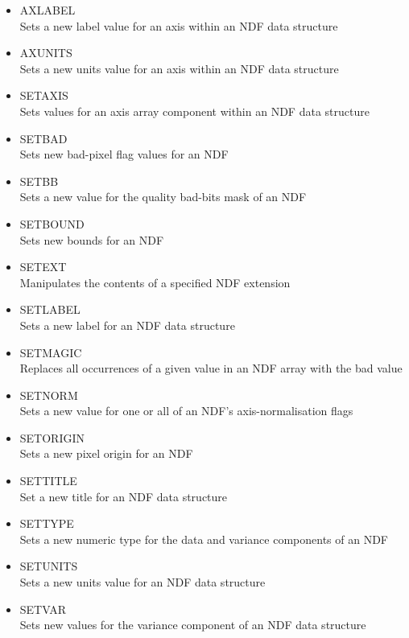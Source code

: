 \documentclass[twoside,11pt]{article}
\newcommand{\xref}[3]{#1}
\begin{document}
\begin{itemize}
\item{\xref{AXLABEL}{sun95}{AXLABEL}}\\
Sets a new label value for an axis within an NDF data structure 
\item{\xref{AXUNITS}{sun95}{AXUNITS}}\\
Sets a new units value for an axis within an NDF data structure 
\item{\xref{SETAXIS}{sun95}{SETAXIS}}\\
Sets values for an axis array component within an NDF data structure 
\item{\xref{SETBAD}{sun95}{SETBAD}}\\
Sets new bad-pixel flag values for an NDF 
\item{\xref{SETBB}{sun95}{SETBB}}\\
Sets a new value for the quality bad-bits mask of an NDF 
\item{\xref{SETBOUND}{sun95}{SETBOUND}}\\
Sets new bounds for an NDF 
\item{\xref{SETEXT}{sun95}{SETEXT}}\\
Manipulates the contents of a specified NDF extension 
\item{\xref{SETLABEL}{sun95}{SETLABEL}}\\
Sets a new label for an NDF data structure 
\item{\xref{SETMAGIC}{sun95}{SETMAGIC}}\\
Replaces all occurrences of a given value in an NDF array with the bad value 
\item{\xref{SETNORM}{sun95}{SETNORM}}\\
Sets a new value for one or all of an NDF's axis-normalisation flags 
\item{\xref{SETORIGIN}{sun95}{SETORIGIN}}\\
Sets a new pixel origin for an NDF 
\item{\xref{SETTITLE}{sun95}{SETTITLE}}\\
Set a new title for an NDF data structure 
\item{\xref{SETTYPE}{sun95}{SETTYPE}}\\
Sets a new numeric type for the data and variance components of an NDF
\item{\xref{SETUNITS}{sun95}{SETUNITS}}\\
Sets a new units value for an NDF data structure 
\item{\xref{SETVAR}{sun95}{SETVAR}}\\
Sets new values for the variance component of an NDF data structure     
\end{itemize}  
  
\end{document}
